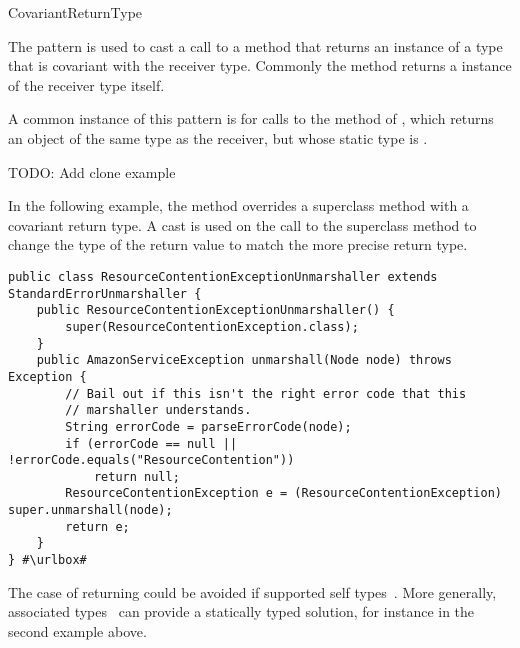 \begin{pattern}{CovariantReturnType}

The \thisp{} pattern is used to cast a call to a method that returns
an instance of a type that is covariant with the 
receiver type.
Commonly the method returns a instance of the receiver type itself.

\instances{}
A common instance of this pattern is for calls to the 
 method of , which returns an object of the same type as the
receiver, but whose static type is .

TODO: Add clone example 

In the following example,
the  method overrides a superclass method with a covariant return type.
A cast is used on the call to the superclass method 
to change the type of the return value to match the more precise return type.

\def\urlvar{http://bit.ly/aws_amplify_aws_sdk_android_2FVWl13}
\begin{verbatim}
public class ResourceContentionExceptionUnmarshaller extends StandardErrorUnmarshaller {
    public ResourceContentionExceptionUnmarshaller() {
        super(ResourceContentionException.class);
    }
    public AmazonServiceException unmarshall(Node node) throws Exception {
        // Bail out if this isn't the right error code that this
        // marshaller understands.
        String errorCode = parseErrorCode(node);
        if (errorCode == null || !errorCode.equals("ResourceContention"))
            return null;
        ResourceContentionException e = (ResourceContentionException) super.unmarshall(node);
        return e;
    }
} #\urlbox#
\end{verbatim}

\discussion{}
  The case of returning  
                 could be avoided if \java{} supported self types~\cite{bruceChallengingTypingIssues2003}.
  More generally, associated types~\cite{chakravartyAssociatedTypeSynonyms2005}
  can provide a statically typed solution, for instance in the second example
  above.

\end{pattern}


